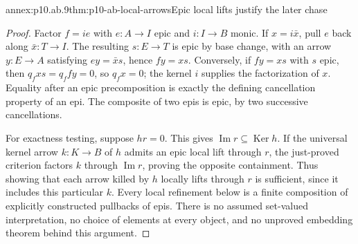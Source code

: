 \begin{annexitem}{annex:p10.ab.9}{thm:p10-ab-local-arrows}{Epic local lifts justify the later chase}
\begin{proof}
Factor \(f=ie\) with \(e:A\to I\) epic and \(i:I\to B\) monic.
If \(x=i\bar x\), pull \(e\) back along \(\bar x:T\to I\).
The resulting \(s:E\to T\) is epic by base change, with an arrow
\(y:E\to A\) satisfying \(ey=\bar xs\), hence \(fy=xs\).
Conversely, if \(fy=xs\) with \(s\) epic, then
\(q_fx s=q_ffy=0\), so \(q_fx=0\); the kernel \(i\) supplies
the factorization of \(x\). Equality after an epic precomposition is
exactly the defining cancellation property of an epi. The composite
of two epis is epic, by two successive cancellations.

For exactness testing, suppose \(hr=0\). This gives
\(\operatorname{Im}r\subseteq\operatorname{Ker}h\).
If the universal kernel arrow \(k:K\to B\) of \(h\) admits an
epic local lift through \(r\), the just-proved criterion factors \(k\)
through \(\operatorname{Im}r\), proving the opposite containment.
Thus showing that each arrow killed by \(h\) locally lifts through
\(r\) is sufficient, since it includes this particular \(k\).
Every local refinement below is a finite composition of explicitly
constructed pullbacks of epis. There is no assumed set-valued
interpretation, no choice of elements at every object, and no unproved
embedding theorem behind this argument.
\end{proof}
\end{annexitem}

